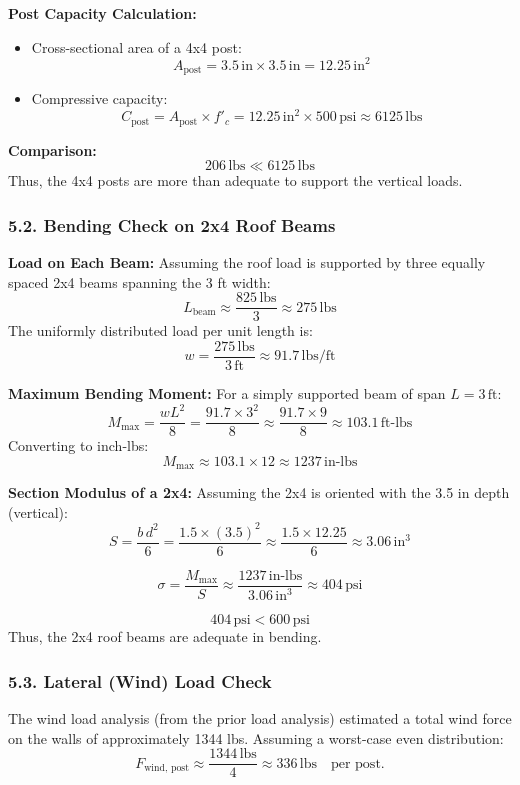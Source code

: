 \documentclass[12pt]{article}
\begin{document}
\noindent\textbf{Post Capacity Calculation:}
\begin{itemize}
    \item Cross-sectional area of a 4x4 post:
    \[
    A_{\text{post}} = 3.5\,\text{in} \times 3.5\,\text{in} = 12.25\,\text{in}^2
    \]
    \item Compressive capacity:
    \[
    C_{\text{post}} = A_{\text{post}} \times f'_c = 12.25\,\text{in}^2 \times 500\,\text{psi} \approx 6125\,\text{lbs}
    \]
\end{itemize}
\textbf{Comparison:}
\[
206\,\text{lbs} \ll 6125\,\text{lbs}
\]
Thus, the 4x4 posts are more than adequate to support the vertical loads.

\subsubsection*{5.2. Bending Check on 2x4 Roof Beams}
\textbf{Load on Each Beam:}  
Assuming the roof load is supported by three equally spaced 2x4 beams spanning the 3 ft width:
\[
L_{\text{beam}} \approx \frac{825\,\text{lbs}}{3} \approx 275\,\text{lbs}
\]
The uniformly distributed load per unit length is:
\[
w = \frac{275\,\text{lbs}}{3\,\text{ft}} \approx 91.7\,\text{lbs/ft}
\]

\noindent\textbf{Maximum Bending Moment:}
For a simply supported beam of span \(L = 3\,\text{ft}\):
\[
M_{\text{max}} = \frac{w L^2}{8} = \frac{91.7 \times 3^2}{8} \approx \frac{91.7 \times 9}{8} \approx 103.1\,\text{ft-lbs}
\]
Converting to inch-lbs:
\[
M_{\text{max}} \approx 103.1 \times 12 \approx 1237\,\text{in-lbs}
\]

\noindent\textbf{Section Modulus of a 2x4:}  
Assuming the 2x4 is oriented with the 3.5 in depth (vertical):
\[
S = \frac{b \, d^2}{6} = \frac{1.5 \times (3.5)^2}{6} \approx \frac{1.5 \times 12.25}{6} \approx 3.06\,\text{in}^3
\]

\[
\sigma = \frac{M_{\text{max}}}{S} \approx \frac{1237\,\text{in-lbs}}{3.06\,\text{in}^3} \approx 404\,\text{psi}
\]

\[
404\,\text{psi} < 600\,\text{psi}
\]
Thus, the 2x4 roof beams are adequate in bending.

\subsubsection*{5.3. Lateral (Wind) Load Check}
The wind load analysis (from the prior load analysis) estimated a total wind force on the walls of approximately 1344 lbs. Assuming a worst-case even distribution:
\[
F_{\text{wind, post}} \approx \frac{1344\,\text{lbs}}{4} \approx 336\,\text{lbs} \quad \text{per post.}
\]
\end{document}

